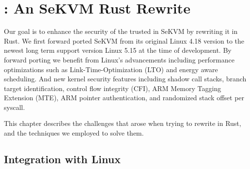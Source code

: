 \chapter{\rustsec{}: An SeKVM Rust Rewrite}
\label{sec:migration}


Our goal is to enhance the security of the trusted \secore{} in SeKVM by
rewriting it in Rust. We first forward ported SeKVM from its original
Linux 4.18 version to the newest long term support version Linux 5.15 at the
time of development.
By forward porting we benefit from Linux's advancements including performance
optimizations such as Link-Time-Optimization (LTO) and energy aware scheduling.
And new kernel security features including  shadow call stacks,
branch target identification, control flow integrity (CFI), ARM Memory Tagging
Extension (MTE), ARM pointer authentication, and randomized stack offset per
syscall.


This chapter describes the challenges that arose when trying to rewrite
\secore{} in Rust, and the techniques we employed to solve them.

\section{Integration with Linux}

%

